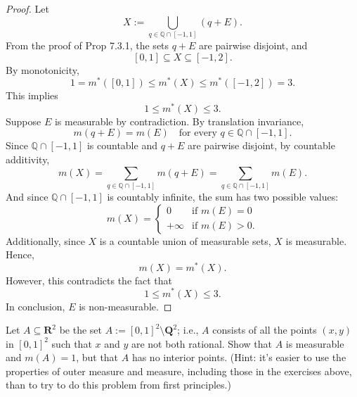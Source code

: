 \begin{proof}
    Let
    \[
    X:=\bigcup_{q\in \mathbb{Q}\cap[-1,1]} (q+E).
    \]
    From the proof of Prop 7.3.1, the sets $q+E$ are pairwise disjoint, and
    \[
    [0,1] \subseteq X \subseteq [-1,2].
    \]
    By monotonicity,
    \[
    1=m^*([0,1])\le m^*(X)\le m^*([-1,2])=3.
    \]
    This implies
    \[
    1\le m^*(X)\le 3.
    \]
    Suppose $E$ is measurable by contradiction. By translation invariance,
    \[
    m(q+E)=m(E) \quad \text{for every } q \in \mathbb{Q}\cap[-1,1].
    \]  
    Since $\mathbb{Q}\cap[-1,1]$ is countable and $q+E$ are pairwise disjoint, by countable additivity,
    \[
    m(X)=\sum_{q\in \mathbb{Q}\cap[-1,1]} m(q+E)
    =\sum_{q\in \mathbb{Q}\cap[-1,1]} m(E).
    \]
    And since $\mathbb{Q}\cap[-1,1]$ is countably infinite, the sum has two possible values:
    \[
    m(X)=
    \begin{cases}
    0 & \text{if } m(E)=0\\
    +\infty & \text{if } m(E)>0.
    \end{cases}
    \]
    Additionally, since $X$ is a countable union of measurable sets, $X$ is measurable. Hence,
    \[
    m(X)=m^*(X).
    \]
    However, this contradicts the fact that
    \[
    1\le m^*(X)\le 3.
    \]
    In conclusion, $E$ is non-measurable.
\end{proof}

\begin{problem}[Exercises 7.4.9.]
    Let $A\subseteq \mathbf{R}^2$ be the set $A:=[0,1]^2\setminus \mathbf{Q}^2$; i.e., $A$ consists of all the points $(x,y)$
in $[0,1]^2$ such that $x$ and $y$ are not both rational. Show that $A$ is measurable and $m(A)=1$,
but that $A$ has no interior points. (Hint: it's easier to use the properties of outer measure and measure, including those
in the exercises above, than to try to do this problem from first principles.)
\end{problem}


